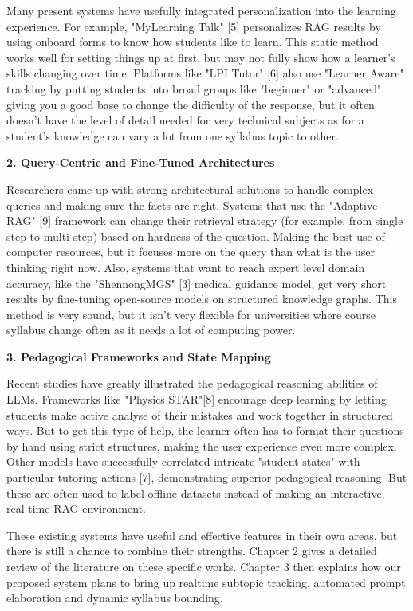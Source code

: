 \documentclass[11pt, a4paper, oneside]{report}
\begin{document}
Many present systems have usefully integrated personalization into the learning experience. For example, "MyLearning Talk" [5] personalizes RAG results by using onboard forms to know how students like to learn. This static method works well for setting things up at first, but may not fully show how a learner’s skills changing over time. Platforms like "LPI Tutor" [6] also use "Learner Aware" tracking by putting students into broad groups like "beginner" or "advanced", giving you a good base to change the difficulty of the response, but it often doesn't have the level of detail needed for very technical subjects as for a student's knowledge can vary a lot from one syllabus topic to other.

\vspace{0.3cm}
\noindent\textbf{2. Query-Centric and Fine-Tuned Architectures}

Researchers came up with strong architectural solutions to handle complex queries and making sure the facts are right. Systems that use the "Adaptive RAG" [9] framework can change their retrieval strategy (for example, from single step to multi step) based on hardness of the question. Making the best use of computer resources, but it focuses more on the query than what is the user thinking right now. Also, systems that want to reach expert level domain accuracy, like the "ShennongMGS" [3] medical guidance model, get very short results by fine-tuning open-source models on structured knowledge graphs. This method is very sound, but it isn't very flexible for universities where course syllabus change often as it needs a lot of computing power.

\vspace{0.3cm}
\noindent\textbf{3. Pedagogical Frameworks and State Mapping}

Recent studies have greatly illustrated the pedagogical reasoning abilities of LLMs. Frameworks like "Physics STAR"[8] encourage deep learning by letting students make active analyse of their mistakes and work together in structured ways. But to get this type of help, the learner often has to format their questions by hand using strict structures, making the user experience even more complex. Other models have successfully correlated intricate "student states" with particular tutoring actions [7], demonstrating superior pedagogical reasoning. But these are often used to label offline datasets instead of making an interactive, real-time RAG environment.

These existing systems have useful and effective features in their own areas, but there is still a chance to combine their strengths. Chapter 2 gives a detailed review of the literature on these specific works. Chapter 3 then explains how our proposed system plans to bring up realtime subtopic tracking, automated prompt elaboration and dynamic syllabus bounding.
\end{document}
